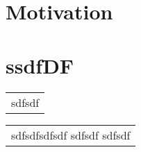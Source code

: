 \documentclass[12pt,twocolumn]{article}
\begin{document}
\title{%
}
\maketitle

\section{Motivation}
\section{ssdfDF}
\begin{tabular}[t]{l}
sdfsdf
\end{tabular}
\begin{tabular}[t]{l}

sdfsdfsdfsdf
sdfsdf
sdfsdf
\end{tabular}
\end{document}
